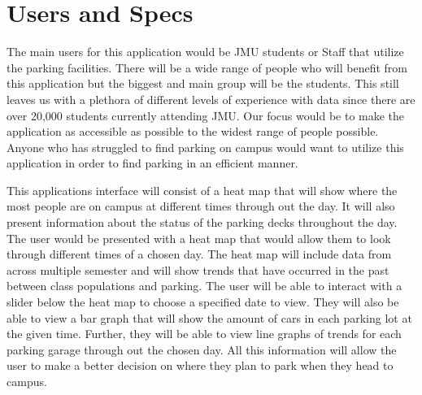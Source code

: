 \documentclass[11pt]{article}
\begin{document}
\section*{Users and Specs}



\indent \indent The main users for this application would be JMU students or Staff that utilize the parking facilities. There will be a wide range of people who will benefit from this application but the biggest and main group will be the students. This still leaves us with a plethora of different levels of experience with data since there are over 20,000 students currently attending JMU. Our focus would be to make the application as accessible as possible to the widest range of people possible. Anyone who has struggled to find parking on campus would want to utilize this application in order to find parking in an efficient manner. 

This applications interface will consist of a heat map that will show where the most people are on campus at different times through out the day. It will also present information about the status of the parking decks throughout the day. The user would be presented with a heat map that would allow them to look through different times of a chosen day. The heat map will include data from across multiple semester and will show trends that have occurred in the past between class populations and parking. The user will be able to interact with a slider below the heat map to choose a specified date to view. They will also be able to view a bar graph that will show the amount of cars in each parking lot at the given time. Further, they will be able to view line graphs of trends for each parking garage through out the chosen day. All this information will allow the user to make a better decision on where they plan to park when they head to campus. 

\end{document}
